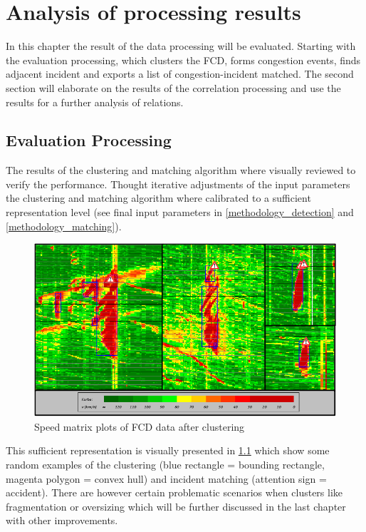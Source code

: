 \chapter{Analysis of processing results}
\label{analysis_processing}
In this chapter the result of the data processing will be evaluated. Starting with the evaluation processing, which clusters the FCD, forms congestion events, finds adjacent incident and exports a list of congestion-incident matched. The second section will elaborate on the results of the correlation processing and use the results for a further analysis of relations.

\section{Evaluation Processing}
\label{analysis_processing_evaluation}
The results of the clustering and matching algorithm where visually reviewed to verify the performance. Thought iterative adjustments of the input parameters the clustering and matching algorithm where calibrated to a sufficient representation level (see final input parameters in \cref{methodology_detection} and \cref{methodology_matching}).
\begin{figure}[ht!]
	\centering
	\includegraphics[scale=0.9]{images/SpeedMatrixPlot_final.png}
	\caption{Speed matrix plots of FCD data after clustering}
	\label{img:speedMatrixPlot_final_good}
\end{figure}
This sufficient representation is visually presented in \cref{img:speedMatrixPlot_final_good} which show some random examples of the clustering (blue rectangle = bounding rectangle, magenta polygon = convex hull) and incident matching (attention sign = accident). There are however certain problematic scenarios when clusters like fragmentation or oversizing which will be further discussed in the last chapter with other improvements.

